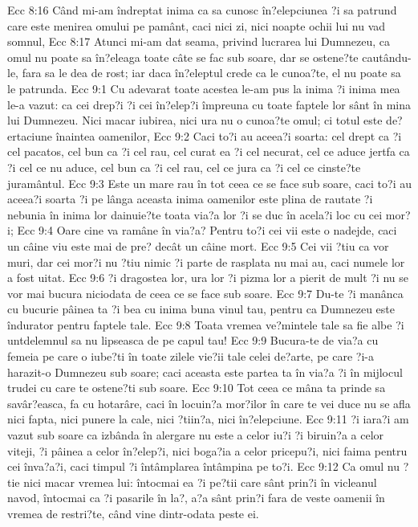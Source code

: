 Ecc 8:16  Când mi-am îndreptat inima ca sa cunosc în?elepciunea ?i sa patrund care este menirea omului pe pamânt, caci nici zi, nici noapte ochii lui nu vad somnul,
Ecc 8:17  Atunci mi-am dat seama, privind lucrarea lui Dumnezeu, ca omul nu poate sa în?eleaga toate câte se fac sub soare, dar se ostene?te cautându-le, fara sa le dea de rost; iar daca în?eleptul crede ca le cunoa?te, el nu poate sa le patrunda.
Ecc 9:1  Cu adevarat toate acestea le-am pus la inima ?i inima mea le-a vazut: ca cei drep?i ?i cei în?elep?i împreuna cu toate faptele lor sânt în mina lui Dumnezeu. Nici macar iubirea, nici ura nu o cunoa?te omul; ci totul este de?ertaciune înaintea oamenilor,
Ecc 9:2  Caci to?i au aceea?i soarta: cel drept ca ?i cel pacatos, cel bun ca ?i cel rau, cel curat ea ?i cel necurat, cel ce aduce jertfa ca ?i cel ce nu aduce, cel bun ca ?i cel rau, cel ce jura ca ?i cel ce cinste?te juramântul.
Ecc 9:3  Este un mare rau în tot ceea ce se face sub soare, caci to?i au aceea?i soarta ?i pe lânga aceasta inima oamenilor este plina de rautate ?i nebunia în inima lor dainuie?te toata via?a lor ?i se duc în acela?i loc cu cei mor?i;
Ecc 9:4  Oare cine va ramâne în via?a? Pentru to?i cei vii este o nadejde, caci un câine viu este mai de pre? decât un câine mort.
Ecc 9:5  Cei vii ?tiu ca vor muri, dar cei mor?i nu ?tiu nimic ?i parte de rasplata nu mai au, caci numele lor a fost uitat.
Ecc 9:6  ?i dragostea lor, ura lor ?i pizma lor a pierit de mult ?i nu se vor mai bucura niciodata de ceea ce se face sub soare.
Ecc 9:7  Du-te ?i manânca cu bucurie pâinea ta ?i bea cu inima buna vinul tau, pentru ca Dumnezeu este îndurator pentru faptele tale.
Ecc 9:8  Toata vremea ve?mintele tale sa fie albe ?i untdelemnul sa nu lipseasca de pe capul tau!
Ecc 9:9  Bucura-te de via?a cu femeia pe care o iube?ti în toate zilele vie?ii tale celei de?arte, pe care ?i-a harazit-o Dumnezeu sub soare; caci aceasta este partea ta în via?a ?i în mijlocul trudei cu care te ostene?ti sub soare.
Ecc 9:10  Tot ceea ce mâna ta prinde sa savâr?easca, fa cu hotarâre, caci în locuin?a mor?ilor în care te vei duce nu se afla nici fapta, nici punere la cale, nici ?tiin?a, nici în?elepciune.
Ecc 9:11  ?i iara?i am vazut sub soare ca izbânda în alergare nu este a celor iu?i ?i biruin?a a celor viteji, ?i pâinea a celor în?elep?i, nici boga?ia a celor pricepu?i, nici faima pentru cei înva?a?i, caci timpul ?i întâmplarea întâmpina pe to?i.
Ecc 9:12  Ca omul nu ?tie nici macar vremea lui: întocmai ea ?i pe?tii care sânt prin?i în vicleanul navod, întocmai ca ?i pasarile în la?, a?a sânt prin?i fara de veste oamenii în vremea de restri?te, când vine dintr-odata peste ei.
